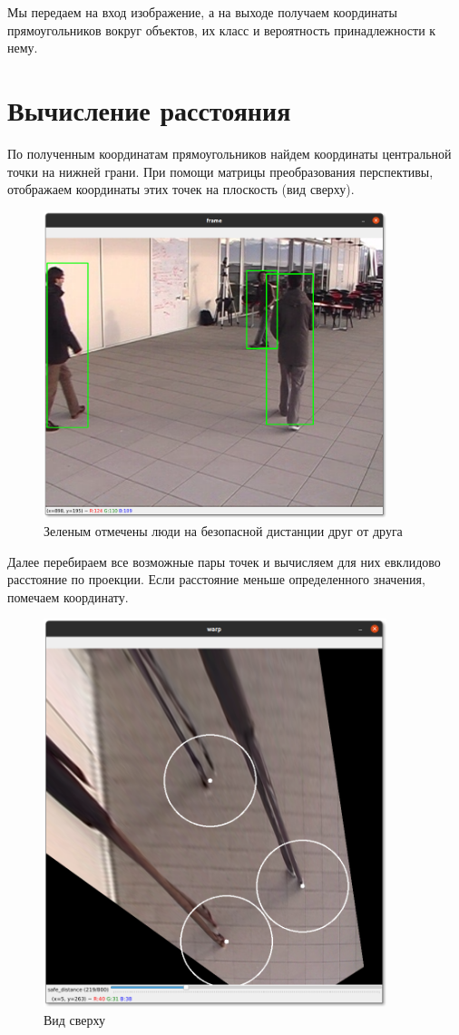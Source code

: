  Мы передаем на вход изображение, а на выходе получаем координаты прямоугольников вокруг объектов, их класс и вероятность принадлежности к нему. 


\section{Вычисление расстояния}

По полученным координатам прямоугольников найдем координаты центральной точки на нижней грани. При помощи матрицы преобразования перспективы, отображаем координаты этих точек на плоскость (вид сверху).

\begin{figure}[H]
    \centering
    \includegraphics[width=10cm]{images/safe1.png}
    \caption{Зеленым отмечены люди на безопасной дистанции друг от друга}
    \label{<label>}
\end{figure}

Далее перебираем все возможные пары точек и вычисляем для них евклидово расстояние по проекции. Если расстояние меньше определенного значения, помечаем координату.

\begin{figure}[H]
    \centering
    \includegraphics[width=10cm]{images/safe2.png}
    \caption{Вид сверху}
    \label{<label>}
\end{figure}

